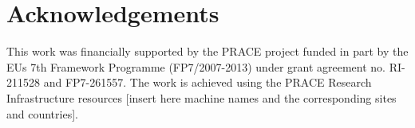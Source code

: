 \documentclass{prace}
\begin{document}
\section*{Acknowledgements}
This work was financially supported by the PRACE project funded in part
by the EUs 7th Framework Programme (FP7/2007-2013) under grant agreement
no. RI-211528 and FP7-261557. The work is achieved using the PRACE 
Research Infrastructure resources [insert here machine names and the 
corresponding sites and countries].

%
\begin{thebibliography}{99}
	\bibitem{}
\end{thebibliography}

\end{document}
